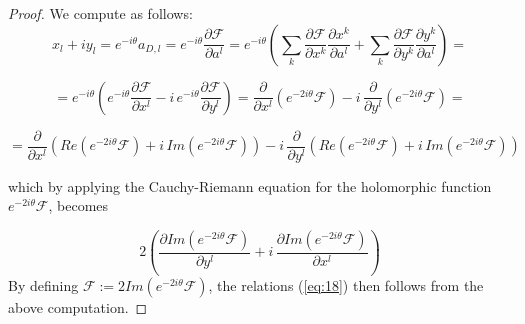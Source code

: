 \documentclass[10pt,a4paper]{amsart}
\begin{document}
\begin{proof} We compute as follows:
\[x_{l}+iy_{l}=e^{-i\theta}a_{D,l}=e^{-i\theta}\frac{\partial\mathcal{F}}{\partial a^{l}}=e^{-i\theta}\left(\sum_{k}\frac{\partial\mathcal{F}}{\partial x^{k}}\frac{\partial x^{k}}{\partial a^{l}}+\sum_{k}\frac{\partial\mathcal{F}}{\partial y^{k}}\frac{\partial y^{k}}{\partial a^{l}}\right)=
\]

\[=e^{-i\theta}\left(e^{-i\theta}\frac{\partial\mathcal{F}}{\partial x^{l}}-i\,e^{-i\theta}\frac{\partial\mathcal{F}}{\partial y^{l}}\right)=\frac{\partial}{\partial x^{l}}\left(e^{-2i\theta}\mathcal{F}\right)-i\,\frac{\partial}{\partial y^{l}}\left(e^{-2i\theta}\mathcal{F}\right)=\]

\[=\frac{\partial}{\partial x^{l}}\left(Re\left(e^{-2i\theta}\mathcal{F}\right)+i\,Im\left(e^{-2i\theta}\mathcal{F}\right)\right)-i\,\frac{\partial}{\partial y^{l}}\left(Re\left(e^{-2i\theta}\mathcal{F}\right)+i\,Im\left(e^{-2i\theta}\mathcal{F}\right)\right)\]

which by applying the Cauchy-Riemann equation for the holomorphic function $e^{-2i\theta}\mathcal{F}$, becomes

\[2\left(\frac{\partial Im\left(e^{-2i\theta}\mathcal{F}\right)}{\partial y^{l}}+i\,\frac{\partial Im\left(e^{-2i\theta}\mathcal{F}\right)}{\partial x^{l}}\right)
\]
By defining $\mathscr{F}:=2Im\left(e^{-2i\theta}\mathcal{F}\right)$, the relations (\ref{eq:18}) then follows from the above computation.
\end{proof}
\end{document}
